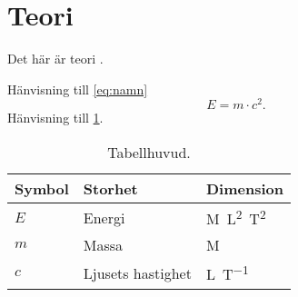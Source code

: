 \section{Teori} \label{s:teori}
%
Det här är teori \cite{einstein}. \n

Hänvisning till \cref{eq:namn}
%
\begin{equation} \label{eq:namn}
    E=m \cdot c^2.
\end{equation}
%
Hänvisning till \cref{tab:namn}.
%
\begin{table}[H]
\centering
\caption{Tabellhuvud.}
\begin{tabular}{@{} l l l @{}} \toprule
\textbf{Symbol} & \textbf{Storhet} & \textbf{Dimension} \\
\midrule
    $E$ & Energi & \si{M.L^2.T^{2}} \\
    $m$ & Massa &\si{M} \\
    $c$ & Ljusets hastighet & \si{L.T^{-1}} \\
\bottomrule 
\end{tabular} \label{tab:namn}
\end{table}
%

